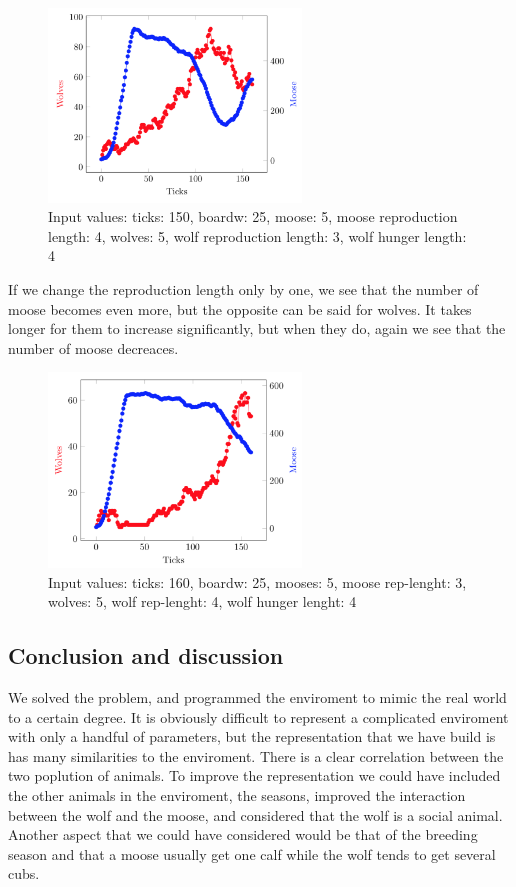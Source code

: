 \documentclass[a4paper]{report}
\begin{document}
\begin{figure}[H]
\centering
\includegraphics[width=0.60\textwidth]{Experiments/sim_rep_c1}
\caption{Input values: ticks: 150, boardw: 25, moose: 5, moose reproduction length: 4, wolves: 5, wolf reproduction length: 3, wolf hunger length: 4}
\end{figure}

If we change the reproduction length only by one, we see that the number of moose becomes even more, but the opposite can be said for wolves. It takes longer for them to increase significantly, but when they do, again we see that the number of moose decreaces. 


\begin{figure}[H]
\centering
\includegraphics[width=0.60\textwidth]{Experiments/sim_rep_c2}
\caption{Input values: ticks: 160, boardw: 25, mooses: 5, moose rep-lenght: 3, wolves: 5, wolf rep-lenght: 4, wolf hunger lenght: 4}
\end{figure}

\subsection*{Conclusion and discussion}
We solved the problem, and programmed the enviroment to mimic the real world to a certain degree. It is obviously difficult to represent a complicated enviroment with only a handful of parameters, but the representation that we have build is has many similarities to the enviroment. There is a clear correlation between the two poplution of animals.
To improve the representation we could have included the other animals in the enviroment, the seasons, improved the interaction between the wolf and the moose, and considered that the wolf is a social animal. Another aspect that we could have considered would be that of the breeding season and that a moose usually get one calf while the wolf tends to get several cubs.
\end{document}
